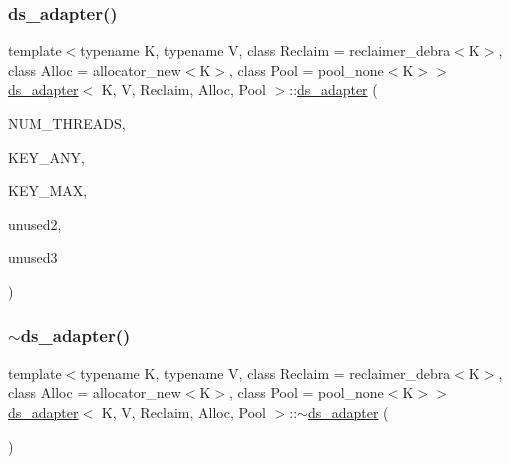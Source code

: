 \mbox{\label{classds__adapter_a257791a567b56a61161d35a86c5cee49}} 
\subsubsection{\texorpdfstring{ds\+\_\+adapter()}{ds\_adapter()}\hspace{0.1cm}{\footnotesize\ttfamily [18/27]}}
{\footnotesize\ttfamily template$<$typename K, typename V, class Reclaim = reclaimer\+\_\+debra$<$\+K$>$, class Alloc = allocator\+\_\+new$<$\+K$>$, class Pool = pool\+\_\+none$<$\+K$>$$>$ \\
\hyperlink{classds__adapter}{ds\+\_\+adapter}$<$ K, V, Reclaim, Alloc, Pool $>$\+::\hyperlink{classds__adapter}{ds\+\_\+adapter} (\begin{DoxyParamCaption}\item[{const int}]{N\+U\+M\+\_\+\+T\+H\+R\+E\+A\+DS,  }\item[{const K \&}]{K\+E\+Y\+\_\+\+A\+NY,  }\item[{const K \&}]{K\+E\+Y\+\_\+\+M\+AX,  }\item[{const V \&}]{unused2,  }\item[{\hyperlink{classRandomFNV1A}{Random\+F\+N\+V1A} $\ast$const}]{unused3 }\end{DoxyParamCaption})\hspace{0.3cm}{\ttfamily [inline]}}

\mbox{\label{classds__adapter_a366f46dd39d59f2d4a147589f5fd98e3}} 
\subsubsection{\texorpdfstring{$\sim$ds\+\_\+adapter()}{~ds\_adapter()}\hspace{0.1cm}{\footnotesize\ttfamily [17/26]}}
{\footnotesize\ttfamily template$<$typename K, typename V, class Reclaim = reclaimer\+\_\+debra$<$\+K$>$, class Alloc = allocator\+\_\+new$<$\+K$>$, class Pool = pool\+\_\+none$<$\+K$>$$>$ \\
\hyperlink{classds__adapter}{ds\+\_\+adapter}$<$ K, V, Reclaim, Alloc, Pool $>$\+::$\sim$\hyperlink{classds__adapter}{ds\+\_\+adapter} (\begin{DoxyParamCaption}{ }\end{DoxyParamCaption})\hspace{0.3cm}{\ttfamily [inline]}}

